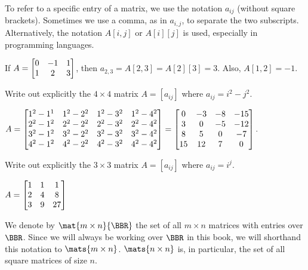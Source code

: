 \begin{df}
To refer to a specific entry of a matrix, we use the
notation $a_{ij}$ (without square brackets).
Sometimes we use a comma, as in $a_{i,j}$,
to separate the two subscripts.
Alternatively, the notation $A[i,j]$ or
$A[i][j]$ is used, 
especially in programming languages.
\end{df}
\begin{exa}
If $\displaystyle A = \begin{bmatrix}0 & -1 & 1 \cr 1 & 2 & 3 \cr\end{bmatrix}$, then $a_{2,3}=A[2,3]=A[2][3]=3$.
Also, $A[1,2]=-1$.
\end{exa}
\begin{exa}
Write out explicitly the $4\times 4$ matrix $A = [a_{ij}]$ where
$a_{ij} = i^2 - j^2$.
\begin{sol} 
$A = \begin{bmatrix} 1^2 - 1^1 & 1^2 - 2^2 & 1^2 -
3^2 & 1^2 - 4^2 \cr 2^2 - 1^2 & 2^2 - 2^2 & 2^2 - 3^2 & 2^2 - 4^2
\cr 3^2 - 1^2 & 3^2 - 2^2 & 3^2 - 3^2 & 3^2 - 4^2 \cr 4^2 - 1^2 &
4^2 - 2^2 & 4^2 - 3^2 & 4^2 - 4^2 \cr
\end{bmatrix} =
\begin{bmatrix}   0 & -3& -8 & -15 \cr
 3 & 0 & -5 & -12 \cr
 8 & 5 & 0 & -7 \cr
 15 & 12 & 7 & 0 \end{bmatrix}. $
 \end{sol}
\end{exa}

\begin{exer}
Write out explicitly the $3\times 3$ matrix $A = [a_{ij}]$ where
$a_{ij} = i^j$.
\vspace*{1.5in}
\begin{answer} $A = \begin{bmatrix} 1 & 1 & 1 \cr
2 & 4 & 8 \cr 3 & 9 & 27 \cr \end{bmatrix}$  
\end{answer}
\end{exer}

\begin{df}
We denote by
$\mat{m\times n}{\BBR}$ the set of all $m\times n$ matrices with
entries over $\BBR$. 
Since we will always be working over $\BBR$ in this book, 
we will shorthand this notation to $\mats{m\times n}$.
$\mats{n\times n}$ is, in particular,
the set of all square matrices of size $n$.
\end{df}

